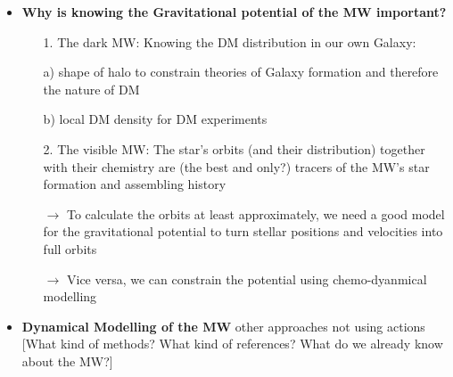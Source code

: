 \begin{itemize}

\item \textbf{Why is knowing the Gravitational potential of the MW important?}
\begin{itemize}
\item[1.] The dark MW: Knowing the DM distribution in our own Galaxy:
\item[a)] shape of halo to constrain theories of Galaxy formation and therefore the nature of DM
\item[b)] local DM density for DM experiments
\item[2.] The visible MW: The star's orbits (and their distribution) together with their chemistry are (the best and only?) tracers of the MW's star formation and assembling history
\item[$\rightarrow$] To calculate the orbits at least approximately, we need a good model for the gravitational potential to turn stellar positions and velocities into full orbits
\item[$\rightarrow$] Vice versa, we can constrain the potential using chemo-dyanmical modelling
\end{itemize}

\item \textbf{Dynamical Modelling of the MW} other approaches not using actions [What kind of methods? What kind of references? What do we already know about the MW?]


\end{itemize}
